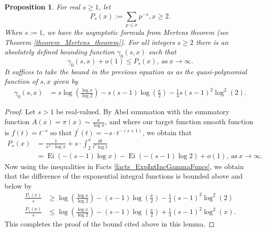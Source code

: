 \documentclass[11pt,reqno,a4letter]{article}
\numberwithin{figure}{section}
\numberwithin{table}{section}
\theoremstyle{plain}
\newtheorem{prop}[theorem]{Proposition}
\numberwithin{theorem}{section}
\theoremstyle{definition}
\newcommand{\NBRef}[1]{}
\begin{document}
\begin{prop} 
\label{cor_PartialSumsOfReciprocalsOfPrimePowers} 
For real $s \geq 1$, let 
\[
P_s(x) := \sum_{p \leq x} p^{-s}, x \geq 2. 
\]
When $s := 1$, we have the asymptotic formula from Mertens theorem 
(see Theorem \ref{theorem_Mertens_theorem}). 
For all integers $s \geq 2$ 
there is an absolutely defined bounding function $\gamma_0(s, x)$ such that 
\[
\gamma_0(s, x) + o(1) \leq P_s(x), \mathrm{\ as\ } x \rightarrow \infty. 
\] 
It suffices to take the bound in the previous equation as as the 
quasi-polynomial function of $s,x$ given by 
\begin{align*} 
\gamma_0(s, x) & = s\log\left(\frac{\log x}{\log 2}\right) - 
     s(s-1) \log\left(\frac{x}{2}\right) - 
     \frac{1}{4} s(s-1)^2 \log^2(2). 
\end{align*}
\end{prop} 
\NBRef{A05-2020-04-26} 
\begin{proof} 
Let $s > 1$ be real-valued. 
By Abel summation with the summatory function $A(x) = \pi(x) \sim \frac{x}{\log x}$, and where 
our target function smooth function is $f(t) = t^{-s}$ so that 
$f^{\prime}(t) = -s \cdot t^{-(s+1)}$, we obtain that 
\begin{align*} 
P_s(x) & = \frac{1}{x^s \cdot \log x} + s \cdot \int_2^{x} \frac{dt}{t^s \log t} \\ 
     & = \operatorname{Ei}(-(s-1) \log x) - \operatorname{Ei}(-(s-1) \log 2) + o(1), 
     \mathrm{\ as\ } x \rightarrow \infty. 
\end{align*} 
Now using the inequalities in Facts \ref{facts_ExpIntIncGammaFuncs}, we obtain that the 
difference of the exponential integral functions is bounded above and below by 
\begin{align*} 
\frac{P_s(x)}{s} & \geq \log\left(\frac{\log x}{\log 2}\right) - (s-1) \log\left(\frac{x}{2}\right) - 
     \frac{1}{4} (s-1)^2 \log^2(2) \\ 
\frac{P_s(x)}{s} & \leq \log\left(\frac{\log x}{\log 2}\right) - (s-1) \log\left(\frac{x}{2}\right) + 
     \frac{1}{4} (s-1)^2 \log^2(x). 
\end{align*} 
This completes the proof of the bound cited above in this lemma. 
\end{proof} 
\end{document}
